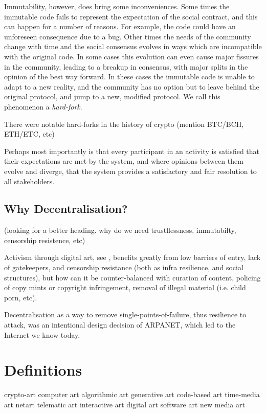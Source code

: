 Immutability, however, does bring some inconveniences. Some times the immutable code fails to represent the expectation of the social contract, and this can happen for a number of reasons. For example, the code could have an unforeseen consequence due to a bug. Other times the needs of the community change with time and the social consensus evolves in ways which are incompatible with the original code. In some cases this evolution can even cause major fissures in the community, leading to a breakup in consensus, with major splits in the opinion of the best way forward. In these cases the immutable code is unable to adapt to a new reality, and the community has no option but to leave behind the original protocol, and jump to a new, modified protocol. We call this phenomenon a \emph{hard-fork}.

There were notable hard-forks in the history of crypto (mention BTC/BCH, ETH/ETC, etc)

Perhaps most importantly is that every participant in an activity is satisfied that their expectations are met by the system, and where opinions between them evolve and diverge, that the system provides a satisfactory and fair resolution to all stakeholders. 

\subsection{Why Decentralisation?}
(looking for a better heading. why do we need trustllessness, immutabilty, censorship resistence, etc)

Activism through digital art, see \cite[p.~212]{hopeDigitalArtsIntroduction2014} , benefits greatly from low barriers of entry, lack of gatekeepers, and censorship resistance (both as infra resilience, and social structures), but how can it be counter-balanced with curation of content, policing of copy mints or copyright infringement, removal of illegal material (i.e. child porn, etc).

Decentralisation as a way to remove single-points-of-failure, thus resilience to attack, was an intentional design decision of ARPANET, which led to the Internet we know today. \cite[p.10]{paulDigitalArt2015}


\section{Definitions}

crypto-art
computer art
algorithmic art
generative art
code-based art
time-media art
netart
telematic art
interactive art
digital art
software art
new media art


